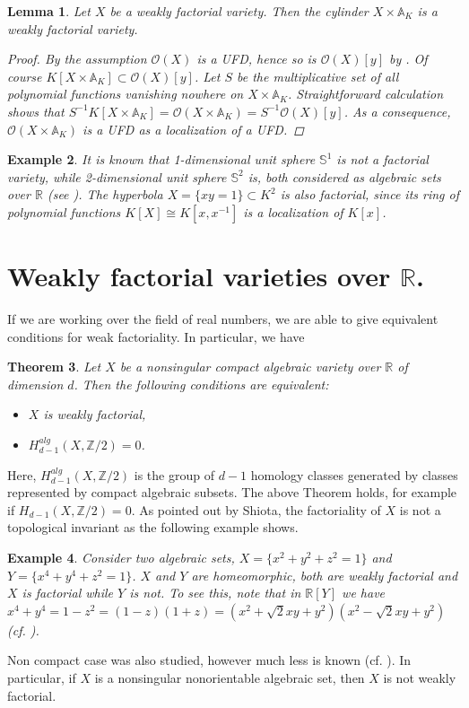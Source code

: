 \documentclass[12pt,reqno]{amsart}   	%
\newtheorem{thm}{Theorem}[section]
\newtheorem{lemma}[thm]{Lemma}
\newtheorem{ex}[thm]{Example}
\theoremstyle{obs}
\theoremstyle{prob}
\theoremstyle{conj}
\theoremstyle{remark}
\newcommand{\Z}{\mathbb{Z}}
\newcommand{\R}{\mathbb{R}}
\newcommand{\OO}{\mathcal{O}}
\begin{document}
\begin{lemma}
Let $X$ be a weakly factorial variety. Then the cylinder $X\times \mathbb{A}_K$ is a weakly factorial variety.

\begin{proof}
By the assumption $\OO(X)$ is a UFD, hence so is $\OO(X)[y]$ by \cite[Theorem 6.14]{hungerford1980}. Of course $K[X\times \mathbb{A}_K] \subset \OO(X)[y]$. Let $S$ be the multiplicative set of all polynomial functions vanishing nowhere on $X\times \mathbb{A}_K$. Straightforward calculation shows that $S^{-1}K[X\times \mathbb{A}_K]  = \OO(X\times \mathbb{A}_K)=S^{-1}\OO(X)[y]$. As a consequence, $\OO(X\times \mathbb{A}_K)$ is a UFD as a localization of a UFD.
\end{proof}
\end{lemma}
\begin{ex}
It is known that 1-dimensional unit sphere $\mathbb{S}^1$ is not a factorial variety, while 2-dimensional unit sphere $\mathbb{S}^2$ is, both considered as algebraic sets over $\R$ (see \cite[Theorem 5]{swan1962}). The hyperbola $X=\{xy=1 \}\subset K^2$ is also factorial, since its ring of polynomial functions $K[X]\cong K[x,x^{-1}]$ is a localization of $K[x]$.
\end{ex}


\section{Weakly factorial varieties over $\R$.}
If we are working over the field of real numbers, we are able to give equivalent conditions for weak factoriality. In particular, we have 

\begin{thm}\cite[Proposition 12.4.14]{bcr1998} Let $X$ be a nonsingular compact algebraic variety over $\R$ of dimension $d$. Then the following conditions are equivalent:
\begin{itemize}
\item $X$ is weakly factorial,  
\item $H_{d-1}^{alg}(X, \Z/2)=0$.
\end{itemize}

\end{thm}
Here, $H_{d-1}^{alg}(X, \Z/2)$ is the group of $d-1$ homology classes generated by classes represented by compact algebraic subsets. The above Theorem holds, for example if $H_{d-1}(X, \Z/2)=0$. As pointed out by Shiota, the factoriality of $X$ is not a topological invariant as the following example shows.
\begin{ex}\cite[Exemple]{shiota1981}
Consider two algebraic sets, $X= \{ x^2+y^2+z^2=1\}$ and $Y=\{x^4+y^4+z^2=1 \}$. $X$ and $Y$ are homeomorphic, both are weakly factorial and $X$ is factorial while $Y$ is not. To see this, note that in $\R[Y]$ we have $x^4+y^4=1-z^2=(1-z)(1+z)=(x^2+\sqrt{2}xy+y^2)(x^2-\sqrt{2}xy+y^2)$ (cf. \cite[Section 7]{bks1982}).

\end{ex}
Non compact case was also studied, however much less is known (cf. \cite[Theorem 5, Remark 6]{bks1982}). In particular, if $X$ is a nonsingular nonorientable algebraic set, then $X$ is not weakly factorial.
\end{document}
